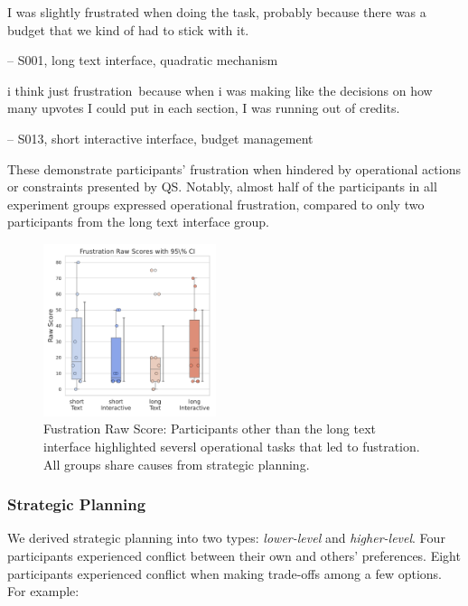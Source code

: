 \begin{displayquote}
I was slightly frustrated when doing the task, probably because there was a budget that we kind of had to stick with it.

\noindent \hfill -- S001, long text interface, quadratic mechanism
\end{displayquote}

\begin{displayquote}
i think just frustration~\bracketellipsis because when i was making like the decisions on how many upvotes I could put in each section, I was running out of credits.

\noindent \hfill -- S013, short interactive interface, budget management
\end{displayquote}

These demonstrate participants' frustration when hindered by operational actions or constraints presented by QS. Notably, almost half of the participants in all experiment groups expressed operational frustration, compared to only two participants from the long text interface group.

\begin{figure} %
    \centering
    \includegraphics[width=0.45\textwidth, trim=0 13 0 13, clip]{content/image/cog/Frustration_scores.pdf}
    \captionsetup{width=0.40\textwidth, justification=justified} %
    \caption{Fustration Raw Score: Participants other than the long text interface highlighted seversl operational tasks that led to fustration. All groups share causes from strategic planning.}
    \label{fig:fustration_cog_score}
\end{figure}

\subsubsection{Strategic Planning}
We derived strategic planning into two types: \textit{lower-level} and \textit{higher-level}. Four participants experienced conflict between their own and others' preferences. Eight participants experienced conflict when making trade-offs among a few options. For example:

